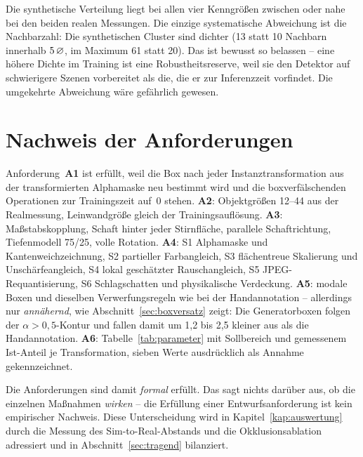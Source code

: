 Die synthetische Verteilung liegt bei allen vier Kenngrößen zwischen oder nahe
bei den beiden realen Messungen. Die einzige systematische Abweichung ist die
Nachbarzahl: Die synthetischen Cluster sind dichter (13 statt 10 Nachbarn
innerhalb $5\,\varnothing$, im Maximum 61 statt 20). Das ist bewusst so belassen -- eine
höhere Dichte im Training ist eine Robustheitsreserve, weil sie den Detektor auf
schwierigere Szenen vorbereitet als die, die er zur Inferenzzeit vorfindet. Die
umgekehrte Abweichung wäre gefährlich gewesen.

\section{Nachweis der Anforderungen}
\label{sec:nachweis}

Anforderung~\textbf{A1} ist erfüllt, weil die Box nach jeder
Instanztransformation aus der transformierten Alphamaske neu bestimmt wird und
die boxverfälschenden Operationen zur Trainingszeit auf~0 stehen.
\textbf{A2}: Objektgrößen 12--44\px{} aus der Realmessung, Leinwandgröße gleich
der Trainingsauflösung. \textbf{A3}: Maßstabskopplung, Schaft hinter jeder
Stirnfläche, parallele Schaftrichtung, Tiefenmodell 75/25, volle Rotation.
\textbf{A4}: S1 Alphamaske und Kantenweichzeichnung, S2 partieller Farbangleich,
S3 flächentreue Skalierung und Unschärfeangleich, S4 lokal geschätzter
Rauschangleich, S5 JPEG-Requantisierung, S6 Schlagschatten und physikalische
Verdeckung. \textbf{A5}: modale Boxen und dieselben Verwerfungsregeln wie bei der
Handannotation -- allerdings nur \emph{annähernd}, wie
Abschnitt~\ref{sec:boxversatz} zeigt: Die Generatorboxen folgen der
$\alpha > 0{,}5$-Kontur und fallen damit um 1,2 bis 2,5\px{} kleiner aus als die
Handannotation. \textbf{A6}: Tabelle~\ref{tab:parameter} mit Sollbereich und
gemessenem Ist-Anteil je Transformation, sieben Werte ausdrücklich als Annahme
gekennzeichnet.

Die Anforderungen sind damit \emph{formal} erfüllt. Das sagt nichts darüber aus,
ob die einzelnen Maßnahmen \emph{wirken} -- die Erfüllung einer
Entwurfsanforderung ist kein empirischer Nachweis. Diese Unterscheidung wird in
Kapitel~\ref{kap:auswertung} durch die Messung des Sim-to-Real-Abstands und die
Okklusionsablation adressiert und in Abschnitt~\ref{sec:tragend} bilanziert.
